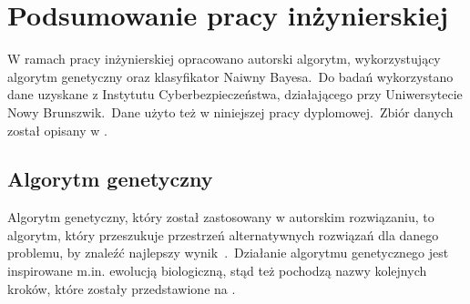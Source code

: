\chapter{Podsumowanie pracy inżynierskiej}
W ramach pracy inżynierskiej opracowano autorski algorytm, wykorzystujący algorytm genetyczny oraz klasyfikator Naiwny Bayesa.\ Do badań wykorzystano dane uzyskane z Instytutu Cyberbezpieczeństwa, działającego przy Uniwersytecie Nowy Brunszwik.\ Dane użyto też w niniejszej pracy dyplomowej.\ Zbiór danych został opisany w .\

\section{Algorytm genetyczny}
Algorytm genetyczny, który został zastosowany w autorskim rozwiązaniu, to algorytm, który przeszukuje przestrzeń alternatywnych rozwiązań dla danego problemu, by znaleźć najlepszy
wynik~\cite{Kusiak2021}.\ Działanie algorytmu genetycznego jest inspirowane m.in. ewolucją biologiczną, stąd też pochodzą nazwy kolejnych kroków, które zostały przedstawione na .


